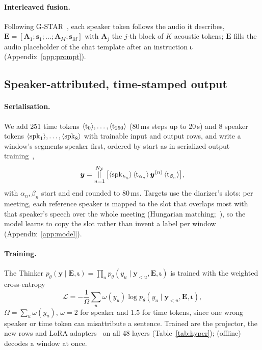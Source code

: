 \paragraph{Interleaved fusion.} Following G-STAR~\citep{peng2026gstar}, each speaker token follows the audio it describes,
$\bm{E}=[\bm{A}_1;\bm{s}_1;\dots;\bm{A}_M;\bm{s}_M]$ with $\bm{A}_j$ the $j$-th block of $K$ acoustic tokens;
$\bm{E}$ fills the audio placeholder of the chat template after an instruction
$\bm{\iota}$ (Appendix~\ref{app:prompt}).

\subsection{Speaker-attributed, time-stamped output}
\label{sec:method-out}
\label{sec:method-train}

\paragraph{Serialisation.} We add 251 time tokens $\langle\mathrm{t}_{0}\rangle,\dots,\langle\mathrm{t}_{250}\rangle$ (80\,ms steps up to 20\,s) and 8 speaker
tokens $\langle\mathrm{spk}_{1}\rangle,\dots,\langle\mathrm{spk}_{8}\rangle$ with trainable input and output rows, and write a window's segments speaker first,
ordered by start as in serialized output training~\citep{kanda2020sot},
\begin{equation}
\bm{y}=\mathop{\Vert}_{n=1}^{N_\mathcal{Y}}\big[\langle\mathrm{spk}_{k_n}\rangle\,\langle\mathrm{t}_{\alpha_n}\rangle\,\bm{y}^{(n)}\,\langle\mathrm{t}_{\beta_n}\rangle\big],
\label{eq:serial}
\end{equation}
with $\alpha_n,\beta_n$ start and end rounded to 80\,ms. Targets use the diarizer's slots: per meeting, each reference
speaker is mapped to the slot that overlaps most with that speaker's speech over the whole meeting (Hungarian
matching;~\citealp{kuhn1955hungarian}), so the model learns to copy the slot rather than invent a label per window
(Appendix~\ref{app:model}).

\paragraph{Training.} The Thinker $p_\theta(\bm{y}\mid\bm{E},\bm{\iota})=\prod_u p_\theta(y_u\mid\bm{y}_{<u},\bm{E},\bm{\iota})$ is trained with the weighted cross-entropy
\begin{equation}
\mathcal{L}=-\frac{1}{\Omega}\sum_{u}\omega(y_u)\log p_\theta(y_u\mid\bm{y}_{<u},\bm{E},\bm{\iota}),
\label{eq:loss}
\end{equation}
$\Omega=\sum_u\omega(y_u)$, $\omega=2$ for speaker and $1.5$ for time tokens, since one wrong speaker or time token can misattribute a sentence.
Trained are the projector, the new rows and LoRA adapters~\citep{hu2022lora} on all 48 layers (Table~\ref{tab:hyper});
\sys{} (offline) decodes a window at once.

